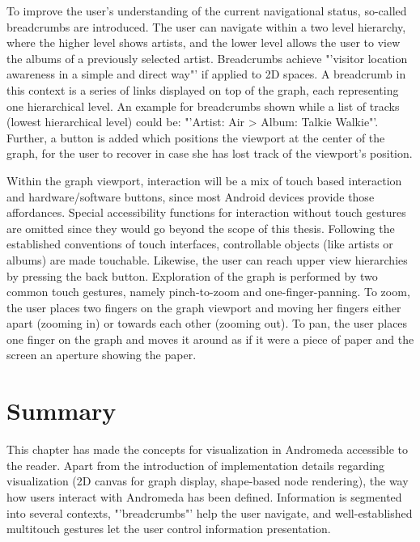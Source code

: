 To improve the user's understanding of the current navigational status, so-called breadcrumbs are introduced. The user can navigate within a two level hierarchy, where the higher level shows artists, and the lower level allows the user to view the albums of a previously selected artist. Breadcrumbs achieve "'visitor location awareness in a simple and direct way"' \cite{Tesoriero:2008:Breadcrumbs} if applied to 2D spaces. A breadcrumb in this context is a series of links displayed on top of the graph, each representing one hierarchical level. An example for breadcrumbs shown while a list of tracks (lowest hierarchical level) could be: "'Artist: Air > Album: Talkie Walkie"'. Further, a button is added which positions the viewport at the center of the graph, for the user to recover in case she has lost track of the viewport's position.

Within the graph viewport, interaction will be a mix of touch based interaction and hardware/software buttons, since most Android devices provide those affordances. Special accessibility functions for interaction without touch gestures are omitted since they would go beyond the scope of this thesis.
Following the established conventions of touch interfaces, controllable objects (like artists or albums) are made touchable. Likewise, the user can reach upper view hierarchies by pressing the back button.
Exploration of the graph is performed by two common touch gestures, namely pinch-to-zoom and one-finger-panning. To zoom, the user places two fingers on the graph viewport and moving her fingers either apart (zooming in) or towards each other (zooming out). To pan, the user places one finger on the graph and moves it around as if it were a piece of paper and the screen an aperture showing the paper.

\section{Summary}

This chapter has made the concepts for visualization in Andromeda accessible to the reader. Apart from the introduction of implementation details regarding visualization (2D canvas for graph display, shape-based node rendering), the way how users interact with Andromeda has been defined. Information is segmented into several contexts, "'breadcrumbs"' help the user navigate, and well-established multitouch gestures let the user control information presentation. 